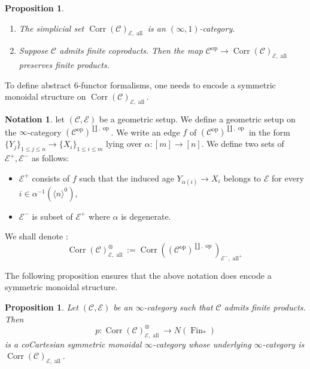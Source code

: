 \documentclass[14pt]{article}
\newtheorem{proposition}[theorem]{Proposition}
\theoremstyle{definition}
\newtheorem{notation}[theorem]{Notation}
\newcommand{\CrrCopEal}{\op{Corr}(\Ca)^{\otimes}_{\E,\op{all}}}
\newcommand{\Ccc}{(\Ca^{\op{op}})^{\coprod,\op{op}}}
\newcommand{\E}{\mathcal{E}}
\newcommand{\op}[1]{\operatorname{#1}}
\newcommand{\Ca}{\mathcal{C}}
\numberwithin{subsection}{section}
\begin{document}
       \begin{proposition}\cite[Section 4]{chowdhury2025sixfunctorformalismsiiiconstruction}
       \begin{enumerate}
           \item  The simplicial set $\op{Corr}(\Ca)_{\E,\op{all}}$ is an $(\infty,1)$-category. 
           \item  Suppose $\Ca$ admits finite coproducts. Then the map $\Ca^{\op{op}} \to \op{Corr}(\Ca)_{\E,\op{all}}$ preserves finite products.
           \end{enumerate}
       \end{proposition}
To define abstract $6$-functor formalisms, one needs to encode a symmetric monoidal structure on $\op{Corr}(\Ca)_{\E,\op{all}}$.
\begin{notation}
    let $(\Ca,\E)$ be a  geometric setup. We define a geometric setup on the $\infty$-category $(\Ca^{\op{op}})^{\coprod,\op{op}}$. We write an edge $f$ of $\Ccc$ in the form $\{Y_j\}_{1\le j \le n} \to \{X_i\}_{1 \le i \le m}$ lying over $\alpha : [m] \to [n]$. We define two sets of $\E^{+},\E^{-}$ as follows:
    \begin{itemize}
        \item $\E^+$ consists of $f$ such that the induced age $Y_{\alpha(i)} \to X_i$ belongs to $\E$ for every $i \in \alpha^{-1}(\langle n \rangle ^0)$,
        \item $\E^-$ is subset of $\E^+$ where $\alpha$ is degenerate.
    \end{itemize}
    We shall denote :
    \begin{equation*}
        \op{Corr}(\Ca)^{\otimes}_{\E,\op{all}} := \op{Corr}(\Ccc)_{\E^{-},\op{all}^+}
    \end{equation*}
\end{notation}
The following proposition ensures that the above notation does encode a symmetric monoidal structure.
\begin{proposition}
    Let $(\Ca,\E)$ be an $\infty$-category such that $\Ca$ admits finite products. Then 
    \begin{equation*}
        p : \CrrCopEal \to N(\op{Fin}_*)
    \end{equation*}
    is a coCartesian symmetric monoidal $\infty$-category whose underlying $\infty$-category is $\op{Corr}(\Ca)_{\E,\op{all}}$.
\end{proposition}
\end{document}

